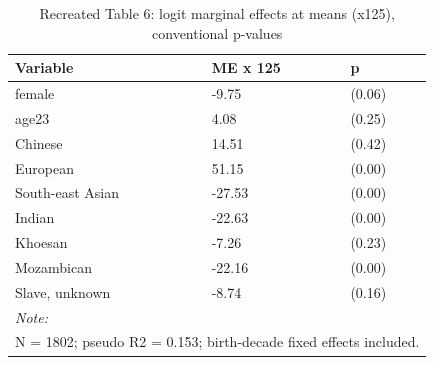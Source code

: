 \begin{table}

\caption{Recreated Table 6: logit marginal effects at means (x125), conventional p-values}
\centering
\begin{tabular}[t]{lll}
\toprule
Variable & ME x 125 & p\\
\midrule
female & -9.75 & (0.06)\\
age23 & 4.08 & (0.25)\\
Chinese & 14.51 & (0.42)\\
European & 51.15 & (0.00)\\
South-east Asian & -27.53 & (0.00)\\
\addlinespace
Indian & -22.63 & (0.00)\\
Khoesan & -7.26 & (0.23)\\
Mozambican & -22.16 & (0.00)\\
Slave, unknown & -8.74 & (0.16)\\
\bottomrule
\multicolumn{3}{l}{\rule{0pt}{1em}\textit{Note: }}\\
\multicolumn{3}{l}{\rule{0pt}{1em}N = 1802; pseudo R2 = 0.153; birth-decade fixed effects included.}\\
\end{tabular}
\end{table}
